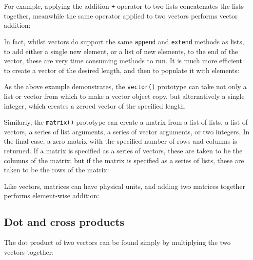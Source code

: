 For example, applying the addition {\tt +} operator to two lists concatenates
the lists together, meanwhile the same operator applied to two vectors performs
vector addition:

\vspace{3mm}

\vspace{3mm}

In fact, whilst vectors do support the same {\tt append} and {\tt extend}
methods as lists, to add either a single new element, or a list of new
elements, to the end of the vector, these are very time consuming methods to
run. It is much more efficient to create a vector of the desired length, and
then to populate it with elements:

\vspace{3mm}

\vspace{3mm}

As the above example demonstrates, the {\tt vector()} prototype can take not
only a list or vector from which to make a vector object copy, but
alternatively a single integer, which creates a zeroed vector of the specified
length.

Similarly, the {\tt matrix()} prototype can create a matrix from a list of
lists, a list of vectors, a series of list arguments, a series of vector
arguments, or two integers. In the final case, a zero matrix with the specified
number of rows and columns is returned. If a matrix is specified as a series of
vectors, these are taken to be the columns of the matrix; but if the matrix is
specified as a series of lists, these are taken to be the rows of the matrix:

\vspace{3mm}

\vspace{3mm}

Like vectors, matrices can have physical units, and adding two matrices together performs element-wise addition:

\vspace{3mm}

\vspace{3mm}

\subsection{Dot and cross products}

The dot product of two vectors can be found simply by multiplying the two vectors together:

